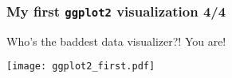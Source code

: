\documentclass[xcolor=dvipsnames, 9pt]{beamer}
\begin{document}
\begin{frame}[fragile]
    \frametitle{My first \texttt{ggplot2} visualization 4/4}
    Who's the baddest data visualizer?! You are!
    \begin{center}
        \texttt{[image: ggplot2\_first.pdf]}
    \end{center}
\end{frame}


\end{document}
